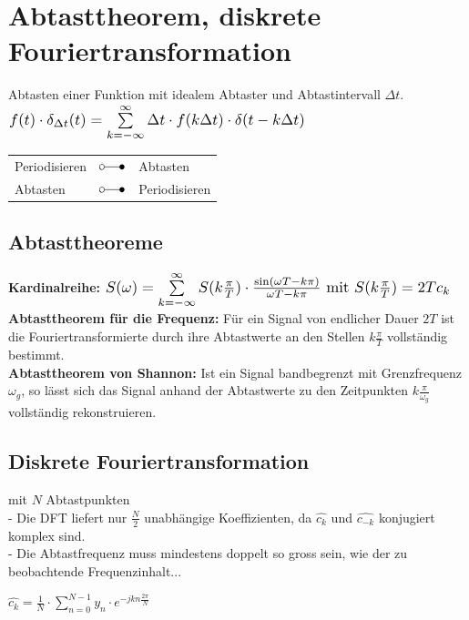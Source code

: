 
\section{Abtasttheorem, diskrete Fouriertransformation }
	\begin{minipage}{12cm}
		Abtasten einer Funktion mit idealem Abtaster und Abtastintervall $\Delta t$.\\
		$ \scalebox{1.2}{$f(t) \cdot \delta_{\Delta t}(t) = \sum\limits_{k=-\infty}^{\infty} \Delta t \cdot f(k \Delta t) \cdot \delta(t-k \Delta t) $}$
	\end{minipage}
	\begin{minipage}{6cm}
		\begin{tabular}{|l l l|}
			\hline
				Periodisieren &$\laplace$ & Abtasten\\
				Abtasten & $\laplace$ & Periodisieren\\
			\hline
		\end{tabular}
	\end{minipage}

\subsection{Abtasttheoreme }
	\textbf{Kardinalreihe:}  $\scalebox{1.2}{$S(\omega) = \sum\limits_{k=-\infty}^{\infty} S(k\frac{\pi}{T}) \cdot \frac{\sin(\omega T - k\pi)}{\omega T - k\pi}$
	mit $S(k\frac{\pi}{T}) = 2Tc_k$}$\\

	\textbf{Abtasttheorem f\"ur die Frequenz:}
	F\"ur ein Signal von endlicher Dauer $2T$ ist die Fouriertransformierte durch ihre Abtastwerte an den Stellen $k\frac{\pi}{T}$
	vollst\"andig bestimmt. \\
	
	\textbf{Abtasttheorem von Shannon:}
	Ist ein Signal bandbegrenzt mit Grenzfrequenz $\omega_g$, so l\"asst sich das Signal anhand der Abtastwerte zu den Zeitpunkten
	$k\frac{\pi}{\omega_g}$ vollst\"andig rekonstruieren.
	
	
\subsection{Diskrete Fouriertransformation }
\begin{minipage}{14cm}
	mit $N$ Abtastpunkten\\
	-	Die DFT liefert nur $\frac{N}{2}$ unabh\"angige Koeffizienten, da $\hat{c_k}$ und $\hat{c_{-k}}$ konjugiert komplex sind.\\
	- Die Abtastfrequenz muss mindestens doppelt so gross sein, wie der zu beobachtende Frequenzinhalt...
\end{minipage}
\hspace{2em}
\begin{minipage}{6cm}
	$\boxed{\hat{c_k} = \frac{1}{N} \cdot \sum\limits_{n=0}^{N-1} y_n \cdot e^{-jkn\frac{2\pi}{N}}}$
\end{minipage}
	
